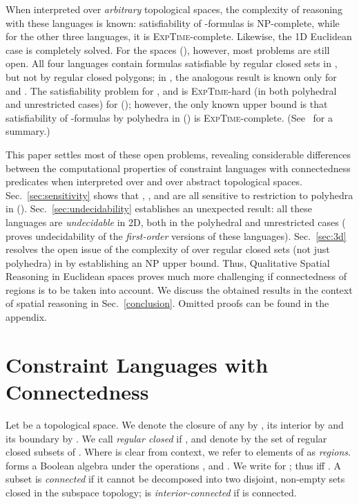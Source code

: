 \documentclass{article}
\newcommand{\NP}{\textsc{NP}}
\newcommand{\ExpTime}{\textsc{ExpTime}}
\begin{document}
When interpreted over {\em arbitrary} topological spaces, the
complexity of reasoning with these languages is known: satisfiability
of -formulas is \NP-complete, while for the other three
languages, it is \ExpTime-complete.  Likewise, the 1D Euclidean case
is completely solved.  For the spaces  (), however,
most problems are still open.  All four languages contain
formulas satisfiable by regular closed sets in , but not by
regular closed polygons; in , the analogous result is known
only for  and . The satisfiability problem for \cBc{},
\cBCc{} and \cBCci{} is \ExpTime-hard (in both polyhedral and
unrestricted cases) for  (); however, the only known
upper bound is that satisfiability of -formulas by
polyhedra in  () is \ExpTime-complete.
(See~\cite{ijcai:kphz10} for a summary.)

This paper settles most of these open problems, revealing considerable
differences between the computational properties of constraint
languages with connectedness predicates when interpreted over 
and over abstract topological spaces.  Sec.~\ref{sec:sensitivity}
shows that , ,  and  are all sensitive to
restriction to polyhedra in  (). Sec.~\ref{sec:undecidability} establishes an unexpected result:
all these languages are \emph{undecidable} in 2D, both in the
polyhedral and unrestricted cases (\cite{Dornheim} proves
undecidability of the \emph{first-order} versions of these
languages). Sec.~\ref{sec:3d} resolves the open issue of the
complexity of  over regular closed sets (not just polyhedra) in
 by establishing an NP upper bound.  Thus, Qualitative Spatial
Reasoning in Euclidean spaces proves much more challenging if
connectedness of regions is to be taken into account.  We discuss the
obtained results in the context of spatial reasoning in
Sec.~\ref{conclusion}.  Omitted proofs can be found in the appendix. 






\section{Constraint Languages with Connectedness}\label{sec:preliminaries}

Let  be a topological space. We denote the closure of any  by , its interior by  and its boundary by
. We call  {\em regular closed}
if , and denote by  the set of regular closed
subsets of . Where  is clear from context, we refer to elements
of  as {\em regions}.  forms a Boolean algebra under
the operations ,  and . We write  for ; thus
 iff .  A subset  is
\emph{connected} if it cannot be decomposed into two disjoint,
non-empty sets closed in the subspace topology;  is
\emph{interior-connected} if  is connected.
\end{document}
